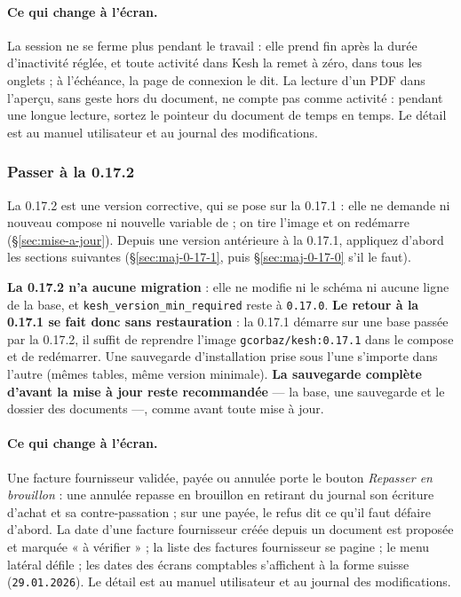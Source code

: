 \documentclass[a4paper,11pt,oneside]{article}
\begin{document}
\paragraph{Ce qui change à l'écran.} La session ne se ferme plus pendant le travail : elle prend fin après la durée d'inactivité réglée, et toute activité dans Kesh la remet à zéro, dans tous les onglets ; à l'échéance, la page de connexion le dit. La lecture d'un PDF dans l'aperçu, sans geste hors du document, ne compte pas comme activité : pendant une longue lecture, sortez le pointeur du document de temps en temps. Le détail est au manuel utilisateur et au journal des modifications.

\subsubsection{Passer à la 0.17.2}\label{sec:maj-0-17-2}

La 0.17.2 est une version corrective, qui se pose sur la 0.17.1 : elle ne demande ni nouveau compose ni nouvelle variable de  ; on tire l'image et on redémarre (\S\ref{sec:mise-a-jour}). Depuis une version antérieure à la 0.17.1, appliquez d'abord les sections suivantes (\S\ref{sec:maj-0-17-1}, puis \S\ref{sec:maj-0-17-0} s'il le faut).

\begin{sloppypar}
\textbf{La 0.17.2 n'a aucune migration} : elle ne modifie ni le schéma ni aucune ligne de la base, et \texttt{kesh\_version\_min\_required} reste à \texttt{0.17.0}. \textbf{Le retour à la 0.17.1 se fait donc sans restauration} : la 0.17.1 démarre sur une base passée par la 0.17.2, il suffit de reprendre l'image \texttt{gcorbaz/kesh:0.17.1} dans le compose et de redémarrer. Une sauvegarde d'installation  prise sous l'une s'importe dans l'autre (mêmes tables, même version minimale). \textbf{La sauvegarde complète d'avant la mise à jour reste recommandée} --- la base, une sauvegarde  et le dossier des documents ---, comme avant toute mise à jour.
\end{sloppypar}

\paragraph{Ce qui change à l'écran.} Une facture fournisseur validée, payée ou annulée porte le bouton \emph{Repasser en brouillon} : une annulée repasse en brouillon en retirant du journal son écriture d'achat et sa contre-passation ; sur une payée, le refus dit ce qu'il faut défaire d'abord. La date d'une facture fournisseur créée depuis un document est proposée et marquée « à vérifier » ; la liste des factures fournisseur se pagine ; le menu latéral défile ; les dates des écrans comptables s'affichent à la forme suisse (\texttt{29.01.2026}). Le détail est au manuel utilisateur et au journal des modifications.
\end{document}

